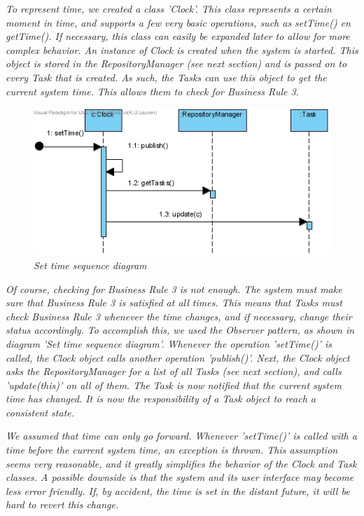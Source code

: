 		\emph{
		To represent time, we created a class 'Clock'. This class represents a certain moment in time, and supports a few very basic operations, such as setTime() en getTime(). If necessary, this class can easily be expanded later to allow for more complex behavior.
		An instance of Clock is created when the system is started. This object is stored in the RepositoryManager (see next section) and is passed on to every Task that is created. As such, the Tasks can use this object to get the current system time. This allows them to check for Business Rule 3.}
		
		\begin{figure}[h]
		\begin{center}
		\includegraphics[scale=0.6]{images/setTime}
		\end{center}
		\caption{\emph{Set time sequence diagram}}
		\end{figure}
		
		\emph{
		Of course, checking for Business Rule 3 is not enough. The system must make sure that Business Rule 3 is satisfied at all times. This means that Tasks must check Business Rule 3 whenever the time changes, and if necessary, change their status accordingly.
		To accomplish this, we used the Observer pattern, as shown in diagram 'Set time sequence diagram'.
		Whenever the operation 'setTime()' is called, the Clock object calls another operation 'publish()'. Next, the Clock object asks the RepositoryManager for a list of all Tasks (see next section), and calls 'update(this)' on all of them. The Task is now notified that the current system time has changed. It is now the responsibility of a Task object to reach a consistent state.}
		
		\emph{
		We assumed that time can only go forward. Whenever 'setTime()' is called with a time before the current system time, an exception is thrown. This assumption seems very reasonable, and it greatly simplifies the behavior of the Clock and Task classes. A possible downside is that the system and its user interface may become less error friendly. If, by accident, the time is set in the distant future, it will be hard to revert this change.}
		
